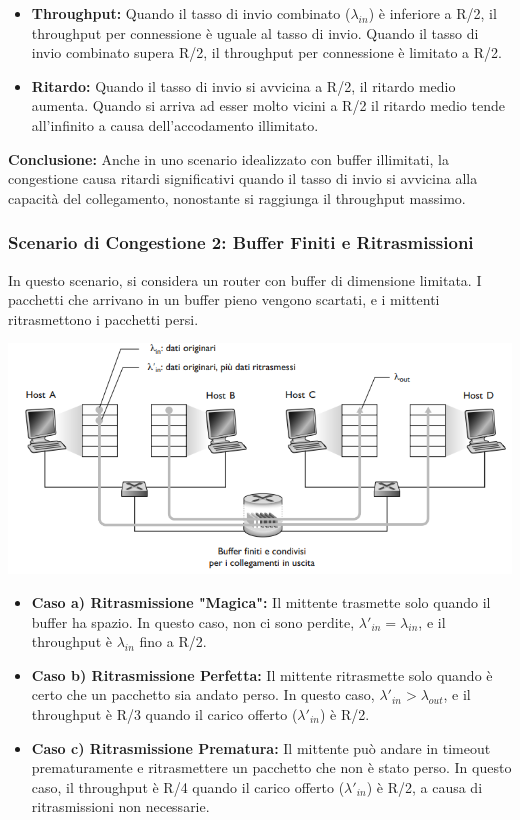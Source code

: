 \begin{itemize}
    \item \textbf{Throughput:} Quando il tasso di invio combinato (\(\lambda_{in}\)) è inferiore a R/2, il throughput per connessione è uguale al tasso di invio. Quando il tasso di invio combinato supera R/2, il throughput per connessione è limitato a R/2.
    \item \textbf{Ritardo:} Quando il tasso di invio si avvicina a R/2, il ritardo medio aumenta. Quando si arriva ad esser molto vicini a R/2 il ritardo medio tende all'infinito a causa dell'accodamento illimitato.
\end{itemize}
\textbf{Conclusione:} Anche in uno scenario idealizzato con buffer illimitati, la congestione causa ritardi significativi quando il tasso di invio si avvicina alla capacità del collegamento, nonostante si raggiunga il throughput massimo.

\subsubsection*{Scenario di Congestione 2: Buffer Finiti e Ritrasmissioni}
In questo scenario, si considera un router con buffer di dimensione limitata. I pacchetti che arrivano in un buffer pieno vengono scartati, e i mittenti ritrasmettono i pacchetti persi.

\begin{center}
  \includegraphics[width=\textwidth]{img/scenario2.png}
\end{center}

\begin{itemize}
    \item \textbf{Caso a) Ritrasmissione "Magica":} Il mittente trasmette solo quando il buffer ha spazio. In questo caso, non ci sono perdite, \(\lambda'_{in} = \lambda_{in}\), e il throughput è \(\lambda_{in}\) fino a R/2.
    \item \textbf{Caso b) Ritrasmissione Perfetta:} Il mittente ritrasmette solo quando è certo che un pacchetto sia andato perso. In questo caso, \(\lambda'_{in} > \lambda_{out}\), e il throughput è R/3 quando il carico offerto (\(\lambda'_{in}\)) è R/2.
    \item \textbf{Caso c) Ritrasmissione Prematura:} Il mittente può andare in timeout prematuramente e ritrasmettere un pacchetto che non è stato perso. In questo caso, il throughput è R/4 quando il carico offerto (\(\lambda'_{in}\)) è R/2, a causa di ritrasmissioni non necessarie.
\end{itemize}

